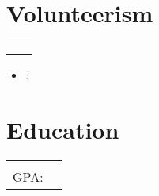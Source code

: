 \documentclass[letterpaper,11pt]{article}
\makeatletter
\newcommand{\org}[4]{
  \begin{tabular*}{\textwidth}{@{\extracolsep{\fill}} l r}
    \bfseries{#1} & #2 \\
    \small #3 & \small #4 \\
  \end{tabular*}
}
\newcommand{\items}{\begin{itemize}[leftmargin=*]}
\newcommand{\itemsEnd}{\end{itemize}}
\makeatother
\begin{document}
\section{Volunteerism}
  \org
    {\VAR{volunteer.name}}{\VAR{volunteer.loc}}
    {\VAR{volunteer.title}}{\VAR{volunteer.date}}
    \items
      \vspace{-5pt}
      \item{{\slshape {}:} }
    \itemsEnd

\section{Education}
  \org
    {\VAR{uni.name}}{\VAR{uni.loc}}
    {GPA: \VAR{uni.gpa}}{\VAR{uni.date}}
    \items
      \begin{minipage}[t]{0.6\linewidth}
        \vspace{-2pt}
        \item {}
      \end{minipage}
      \hspace{0.04\linewidth}
      \begin{minipage}[t]{0.35\linewidth}
        \vspace{-2pt}
        \item {}
      \end{minipage}
    \itemsEnd
\end{document}
